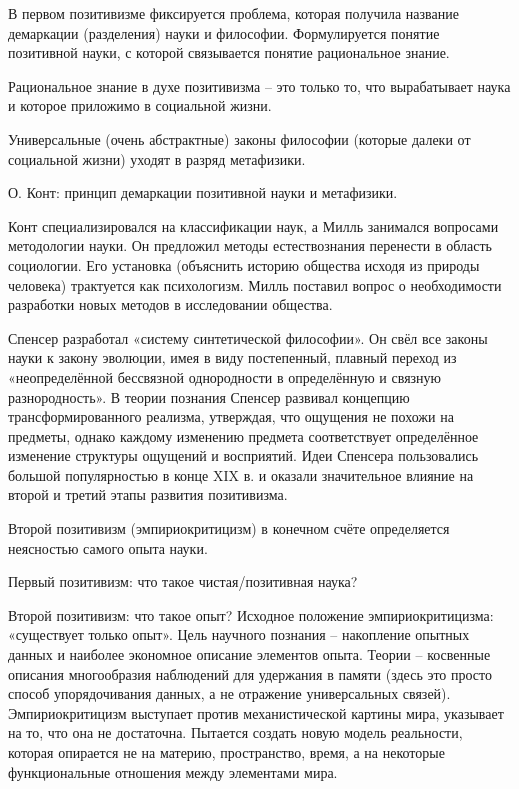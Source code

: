 \documentclass[exam_answers.tex]{subfiles}
\begin{document}
\renewcommand{\baselinestretch}{0.75}

В первом позитивизме фиксируется проблема, которая получила название демаркации (разделения) науки и философии.
Формулируется понятие позитивной науки, с которой связывается понятие рациональное знание.

Рациональное знание в духе позитивизма – это только то, что вырабатывает наука и которое приложимо в социальной жизни.

Универсальные (очень абстрактные) законы философии (которые далеки от социальной жизни) уходят в разряд метафизики.

О. Конт: принцип демаркации позитивной науки и метафизики.

Конт специализировался на классификации наук, а Милль занимался вопросами методологии науки. Он предложил методы естествознания перенести в область социологии.
Его установка (объяснить историю общества исходя из природы человека) трактуется как психологизм.
Милль поставил вопрос о необходимости разработки новых методов в исследовании общества.

Спенсер разработал «систему синтетической философии».
Он свёл все законы науки к закону эволюции, имея в виду постепенный, плавный переход из «неопределённой бессвязной однородности в определённую и связную разнородность».
В теории познания Спенсер развивал концепцию трансформированного реализма, утверждая, что ощущения не похожи на предметы, однако каждому изменению предмета соответствует определённое изменение структуры ощущений и восприятий.
Идеи Спенсера пользовались большой популярностью в конце XIX в. и оказали значительное влияние на второй и третий этапы развития позитивизма.

Второй позитивизм (эмпириокритицизм) в конечном счёте определяется неясностью самого опыта науки.

Первый позитивизм: что такое чистая/позитивная наука?

Второй позитивизм: что такое опыт?
Исходное положение эмпириокритицизма: «существует только опыт».
Цель научного познания – накопление опытных данных и наиболее экономное описание элементов опыта.
Теории – косвенные описания многообразия наблюдений для удержания в памяти (здесь это просто способ упорядочивания данных, а не отражение универсальных связей).
Эмпириокритицизм выступает против механистической картины мира, указывает на то, что она не достаточна.
Пытается создать новую модель реальности, которая опирается не на материю, пространство, время, а на некоторые функциональные отношения между элементами мира.
\end{document}
